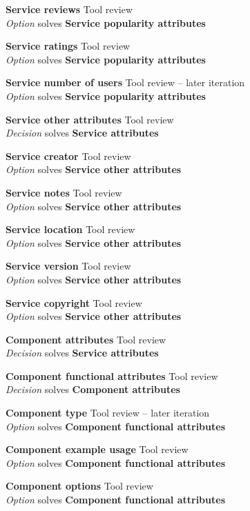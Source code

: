 \textbf{Service reviews} \hfill Tool review \\ \emph{Option} \hfill solves \textbf{Service popularity attributes}

\textbf{Service ratings} \hfill Tool review \\ \emph{Option} \hfill solves \textbf{Service popularity attributes}

\textbf{Service number of users} \hfill Tool review  -- later iteration \\ \emph{Option} \hfill solves \textbf{Service popularity attributes}

\textbf{Service other attributes} \hfill Tool review \\ \emph{Decision} \hfill solves \textbf{Service attributes}

\textbf{Service creator} \hfill Tool review \\ \emph{Option} \hfill solves \textbf{Service other attributes}

\textbf{Service notes} \hfill Tool review \\ \emph{Option} \hfill solves \textbf{Service other attributes}

\textbf{Service location} \hfill Tool review \\ \emph{Option} \hfill solves \textbf{Service other attributes}

\textbf{Service version} \hfill Tool review \\ \emph{Option} \hfill solves \textbf{Service other attributes}

\textbf{Service copyright} \hfill Tool review \\ \emph{Option} \hfill solves \textbf{Service other attributes}

\textbf{Component attributes} \hfill Tool review \\ \emph{Decision} \hfill solves \textbf{Service attributes}

\textbf{Component functional attributes} \hfill Tool review \\ \emph{Decision} \hfill solves \textbf{Component attributes}

\textbf{Component type} \hfill Tool review  -- later iteration \\ \emph{Option} \hfill solves \textbf{Component functional attributes}

\textbf{Component example usage} \hfill Tool review \\ \emph{Option} \hfill solves \textbf{Component functional attributes}

\textbf{Component options} \hfill Tool review \\ \emph{Option} \hfill solves \textbf{Component functional attributes}

